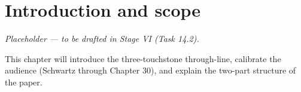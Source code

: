 \chapter{Introduction and scope}\label{ch:intro}

\emph{Placeholder --- to be drafted in Stage VI (Task 14.2).}

This chapter will introduce the three-touchstone through-line, calibrate the audience (Schwartz through Chapter 30), and explain the two-part structure of the paper.
